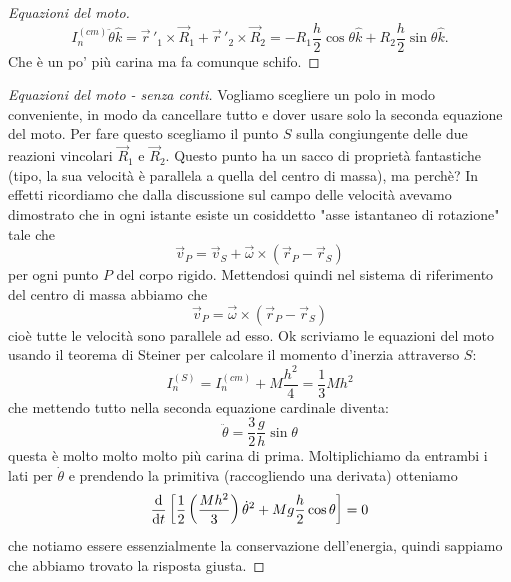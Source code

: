 \documentclass[11pt]{scrartcl}
\newcommand{\dif}{\text{d}}
\newcommand{\khat}{\hat{k}}
\newcommand{\posit}{\vec{r}}
\begin{document}
\begin{sol}
\begin{proof}[Equazioni del moto]
			$$I_n^{(cm)}\ddot{\theta}\khat=\posit\,'_1\times\vec{R}_1+\posit\,'_2\times\vec{R}_2=-R_1\frac{h}{2}\cos\theta\khat+R_2\frac{h}{2}\sin\theta\khat.$$
			Che è un po' più carina	ma fa comunque schifo.		
		\end{proof}
		\begin{proof}[Equazioni del moto - senza conti]
			Vogliamo scegliere un polo in modo conveniente, in modo da cancellare tutto e dover usare solo la seconda equazione del moto. Per fare questo scegliamo il punto $S$ sulla congiungente delle due reazioni vincolari $\vec{R}_1$ e $\vec{R}_2$. Questo punto ha un sacco di proprietà fantastiche (tipo, la sua velocità è parallela a quella del centro di massa), ma perchè? In effetti ricordiamo che dalla discussione sul campo delle velocità avevamo dimostrato che in ogni istante esiste un cosiddetto "asse istantaneo di rotazione" tale che
			$$\vec{v}_P=\vec{v}_S+\vec{\omega}\times\left(\posit_P-\posit_S\right)$$
			per ogni punto $P$ del corpo rigido. Mettendosi quindi nel sistema di riferimento del centro di massa abbiamo che 
			$$\vec{v}_P=\vec{\omega}\times\left(\posit_P-\posit_S\right)$$
			cioè tutte le velocità sono parallele ad esso. Ok scriviamo le equazioni del moto usando il teorema di Steiner per calcolare il momento d'inerzia attraverso $S$:
			$$I^{(S)}_n=I_n^{(cm)}+M\frac{h^2}{4}=\frac{1}{3}M h^2$$
			che mettendo tutto nella seconda equazione cardinale diventa:
			$$\ddot{\theta}=\frac{3}{2}\frac{g}{h}\sin\theta$$
			questa è molto molto molto più carina di prima. Moltiplichiamo da entrambi i lati per $\dot{\theta}$ e prendendo la primitiva (raccogliendo una derivata) otteniamo
			$$\frac{\dif}{\dif t}\left[\half \left(\frac{M h^2}{3}\right)\dot{\theta}^2+Mg\frac{h}{2}\cos\theta\right]=0$$
			che notiamo essere essenzialmente la conservazione dell'energia, quindi sappiamo che abbiamo trovato la risposta giusta.
		\end{proof}
	\end{sol}
\end{document}
